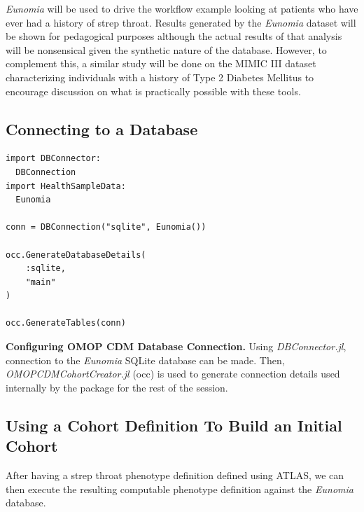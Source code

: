 \documentclass{juliacon}
\begin{document}
\textit{Eunomia} will be used to drive the workflow example looking at patients who have ever had a history of strep throat.
Results generated by the \textit{Eunomia} dataset will be shown for pedagogical purposes although the actual results of that analysis will be nonsensical given the synthetic nature of the database.
However, to complement this, a similar study will be done on the MIMIC III dataset characterizing individuals with a history of Type 2 Diabetes Mellitus to encourage discussion on what is practically possible with these tools.

\subsection{Connecting to a Database}

\begin{listing}[!ht]
\begin{verbatim}
import DBConnector: 
  DBConnection
import HealthSampleData: 
  Eunomia

conn = DBConnection("sqlite", Eunomia())

occ.GenerateDatabaseDetails(
    :sqlite,
    "main"
)

occ.GenerateTables(conn)
\end{verbatim}
\caption{\textbf{Configuring OMOP CDM Database Connection.} Using \textit{DBConnector.jl}, connection to the \textit{Eunomia} SQLite database can be made. Then, \textit{OMOPCDMCohortCreator.jl} (occ) is used to generate connection details used internally by the package for the rest of the session.}
\label{listing:connection}
\end{listing}

\subsection{Using a Cohort Definition To Build an Initial Cohort}

After having a strep throat phenotype definition defined using ATLAS, we can then execute the resulting computable phenotype definition against the \textit{Eunomia} database.
\end{document}
